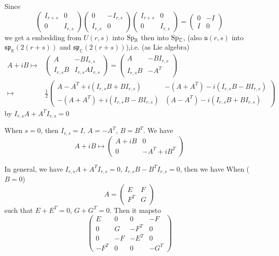 \documentclass[12pt]{amsart}
\def\bR{{\mathbb{R}}}
\def\bC{{\mathbb{C}}}
\def\sp{{\mathfrak{sp}}}
\def\Sp{{\rm Sp}}
\def\fuu{\mathfrak{u}}
\newcounter{ssection}
\renewcommand{\subsection}{
  \addtocounter{ssection}{1}{\bf  \arabic{ssection}.\  }}
\begin{document}
Since
\[
\begin{pmatrix}
I_{r+s} & 0\\
0 & I_{r,s}
\end{pmatrix}
\begin{pmatrix}
0 & -I_{r,s}\\
I_{r,s} & 0
\end{pmatrix}
\begin{pmatrix}
I_{r+s} & 0\\
0 & I_{r,s}
\end{pmatrix}
= \begin{pmatrix}
0&-I\\
I & 0
\end{pmatrix}
\]
we get a embedding from $U(r,s)$ into $\Sp_\bR$ then into $\Sp_\bC$,
(also $\fuu(r,s)$ into 
$\sp_\bR(2(r+s))$ and $\sp_\bC(2(r+s))$),i.e. (as Lie algebra)
\[
\begin{split}
A+iB\mapsto &
\begin{pmatrix}
A & -B I_{r,s}\\
I_{r,s} B & I_{r,s}AI_{r,s}
\end{pmatrix}
=
\begin{pmatrix}
A & -B I_{r,s}\\
I_{r,s} B & -A^T
\end{pmatrix}\\
\mapsto &\frac{1}{2}
\begin{pmatrix}
A-A^T + i(I_{r,s}B + BI_{r,s}) & - (A+A^T) - i(I_{r,s}B-BI_{r,s})\\
-(A+A^T) + i(I_{r,s}B - BI_{r,s})& (A-A^T) - i(I_{r,s}B+BI_{r,s})
\end{pmatrix}
\end{split}
\]
by $I_{r,s} A + A^TI_{r,s} = 0$

\subsection{cases}
When $s=0$, then $I_{r,s} = I$, $A=-A^T$, $B=B^T$.
We have 
\[
A+iB \mapsto 
\begin{pmatrix}
A + iB & 0\\
0& -A^T +iB^T
\end{pmatrix}
\]

In general, 
we have $I_{r,s}A + A^T I_{r,s} = 0$, $I_{r,s}B -B^T I_{r,s} =0$, then we have
When ($B=0$)
\[
A = \begin{pmatrix}
E & F\\
F^T & G
\end{pmatrix}
\] 
such that $E+E^T=0$, $G+G^T=0$. 
Then it mapsto 
\[
\begin{pmatrix}
E & 0 & 0 & -F \\
0 & G & -F^T & 0 \\
0 & -F& -E^T & 0 \\
-F^T & 0& 0 & -G^T 
\end{pmatrix}
\]
\end{document}
